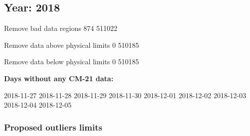 \documentclass[
  10pt,
  a4paper,oneside]{article}
\begin{document}
\FloatBarrier

\newpage

\hypertarget{year-2018}{%
\subsection{Year: 2018}\label{year-2018}}

Remove bad data regions
874 511022

Remove data above physical limits
0 510185

Remove data below physical limits
0 510185

\textbf{Days without any CM-21 data:}

2018-11-27 2018-11-28 2018-11-29 2018-11-30 2018-12-01 2018-12-02 2018-12-03 2018-12-04 2018-12-05

\hypertarget{proposed-outliers-limits-25}{%
\subsubsection{Proposed outliers limits}\label{proposed-outliers-limits-25}}

\footnotesize
\end{document}

